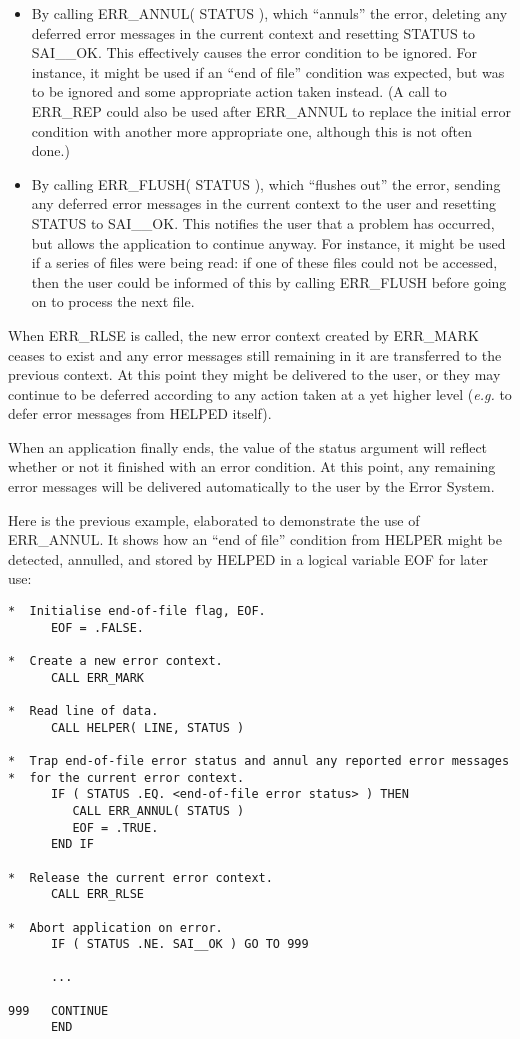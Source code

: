 \begin {itemize}
\item By calling ERR\_ANNUL( STATUS ), which ``annuls'' the error, deleting 
any deferred error messages in the current context and resetting STATUS to 
SAI\_\_OK.
This effectively causes the error condition to be ignored.
For instance, it might be used if an ``end of file'' condition was expected, 
but was to be ignored and some appropriate action taken instead.
(A call to ERR\_REP could also be used after ERR\_ANNUL to replace the 
initial error condition with another more appropriate one, although this is
not often done.) 

\item By calling ERR\_FLUSH( STATUS ), which ``flushes out'' the error, 
sending any deferred error messages in the current context to the user and
resetting STATUS to SAI\_\_OK. 
This notifies the user that a problem has occurred, but allows the 
application to continue anyway.
For instance, it might be used if a series of files were being read: if one
of these files could not be accessed, then the user could be informed of
this by calling ERR\_FLUSH before going on to process the next file. 
\end{itemize}

When ERR\_RLSE is called, the new error context created by ERR\_MARK ceases
to exist and any error messages still remaining in it are transferred to the
previous context. 
At this point they might be delivered to the user, or they may continue
to be deferred according to any action taken at a yet higher level ({\em e.g.}
to  defer error messages from HELPED itself).

When an application finally ends, the value of the status argument will
reflect whether or not it finished with an error condition. 
At this point, any remaining error messages will be delivered automatically
to the user by the Error System. 

Here is the previous example, elaborated to demonstrate the use of ERR\_ANNUL.
It shows how an ``end of file'' condition from HELPER might be detected, 
annulled, and stored by HELPED in a logical variable EOF for later use:

\begin {small}
\begin{verbatim}
*  Initialise end-of-file flag, EOF.
      EOF = .FALSE.

*  Create a new error context.
      CALL ERR_MARK

*  Read line of data.
      CALL HELPER( LINE, STATUS )

*  Trap end-of-file error status and annul any reported error messages
*  for the current error context.
      IF ( STATUS .EQ. <end-of-file error status> ) THEN
         CALL ERR_ANNUL( STATUS )
         EOF = .TRUE.
      END IF

*  Release the current error context.
      CALL ERR_RLSE

*  Abort application on error.
      IF ( STATUS .NE. SAI__OK ) GO TO 999

      ...

999   CONTINUE
      END
\end{verbatim}
\end {small}

